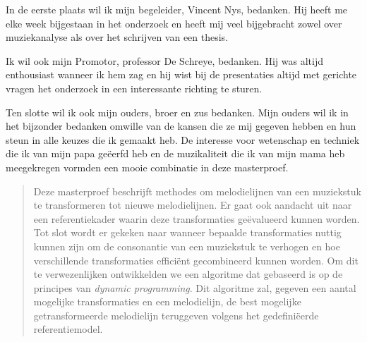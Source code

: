 \documentclass[master=cws]{kulemt}
\begin{document}
\begin{preface}
  In de eerste plaats wil ik mijn begeleider, Vincent Nys, bedanken. Hij heeft me elke week bijgestaan in het onderzoek en heeft mij veel bijgebracht zowel over muziekanalyse als over het schrijven van een thesis.
  
  Ik wil ook mijn Promotor, professor De Schreye, bedanken. Hij was altijd enthousiast wanneer ik hem zag en hij wist bij de presentaties altijd met gerichte vragen het onderzoek in een interessante richting te sturen.
  
  Ten slotte wil ik ook mijn ouders, broer en zus bedanken. Mijn ouders wil ik in het bijzonder bedanken omwille van de kansen die ze mij gegeven hebben en hun steun in alle keuzes die ik gemaakt heb. De interesse voor wetenschap en techniek die ik van mijn papa ge\"eerfd heb en de muzikaliteit die ik van mijn mama heb meegekregen vormden een mooie combinatie in deze masterproef.
\end{preface}

\tableofcontents*

\begin{abstract}
Deze masterproef beschrijft methodes om melodielijnen van een muziekstuk te transformeren tot nieuwe melodielijnen. Er gaat ook aandacht uit naar een referentiekader waarin deze transformaties ge\"evalueerd kunnen worden. Tot slot wordt er gekeken naar wanneer bepaalde transformaties nuttig kunnen zijn om de consonantie van een muziekstuk te verhogen en hoe verschillende transformaties effici\"ent gecombineerd kunnen worden. Om dit te verwezenlijken ontwikkelden we een algoritme dat gebaseerd is op de principes van \textit{dynamic programming}. Dit algoritme zal, gegeven een aantal mogelijke transformaties en een melodielijn, de best mogelijke getransformeerde melodielijn teruggeven volgens het gedefini\"eerde referentiemodel.
\end{abstract}
\end{document}
